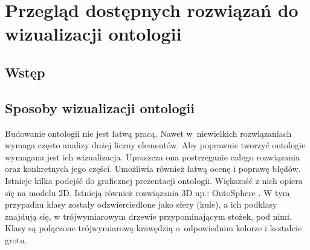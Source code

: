 
\chapter{Przegląd dostępnych rozwiązań do wizualizacji ontologii}
\section{Wstęp}

\section{Sposoby wizualizacji ontologii}
Budowanie ontologii nie jest łatwą pracą. Nawet w~niewielkich rozwiązaniach wymaga często analizy dużej liczny elementów. 
Aby poprawnie tworzyć ontologie wymagana jest ich wizualizacja. Upraszcza ona postrzeganie całego rozwiązania oraz konkretnych jego części.
 Umożliwia również łatwą ocenę i poprawę błędów. 
\newline
Istnieje kilka podejść do graficznej prezentacji ontologii. Większość 
z nich opiera się na modelu 2D. Istnieją również rozwiązania 3D np.: OntoSphere \cite{VisOnto} \cite{OntoSphere}. W tym przypadku klasy zostały odzwierciedlone
 jako sfery (kule), a ich podklasy znajdują się, w trójwymiarowym drzewie przypominającym stożek, pod nimi. Klasy są połączone trójwymiarową krawędzią 
o~odpowiednim kolorze i kształcie grotu. 
